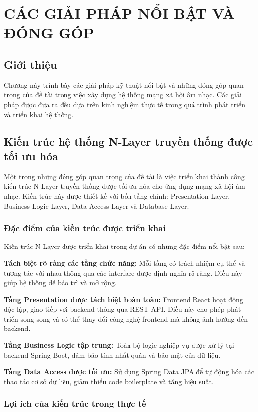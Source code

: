 \chapter{CÁC GIẢI PHÁP NỔI BẬT VÀ ĐÓNG GÓP}

\section{Giới thiệu}
Chương này trình bày các giải pháp kỹ thuật nổi bật và những đóng góp quan trọng của đề tài trong việc xây dựng hệ thống mạng xã hội âm nhạc. Các giải pháp được đưa ra đều dựa trên kinh nghiệm thực tế trong quá trình phát triển và triển khai hệ thống.

\section{Kiến trúc hệ thống N-Layer truyền thống được tối ưu hóa}

Một trong những đóng góp quan trọng của đề tài là việc triển khai thành công kiến trúc N-Layer truyền thống được tối ưu hóa cho ứng dụng mạng xã hội âm nhạc. Kiến trúc này được thiết kế với bốn tầng chính: Presentation Layer, Business Logic Layer, Data Access Layer và Database Layer.

\subsection{Đặc điểm của kiến trúc được triển khai}

Kiến trúc N-Layer được triển khai trong dự án có những đặc điểm nổi bật sau:

\textbf{Tách biệt rõ ràng các tầng chức năng:} Mỗi tầng có trách nhiệm cụ thể và tương tác với nhau thông qua các interface được định nghĩa rõ ràng. Điều này giúp hệ thống dễ bảo trì và mở rộng.

\textbf{Tầng Presentation được tách biệt hoàn toàn:} Frontend React hoạt động độc lập, giao tiếp với backend thông qua REST API. Điều này cho phép phát triển song song và có thể thay đổi công nghệ frontend mà không ảnh hưởng đến backend.

\textbf{Tầng Business Logic tập trung:} Toàn bộ logic nghiệp vụ được xử lý tại backend Spring Boot, đảm bảo tính nhất quán và bảo mật của dữ liệu.

\textbf{Tầng Data Access được tối ưu:} Sử dụng Spring Data JPA để tự động hóa các thao tác cơ sở dữ liệu, giảm thiểu code boilerplate và tăng hiệu suất.

\subsection{Lợi ích của kiến trúc trong thực tế}

